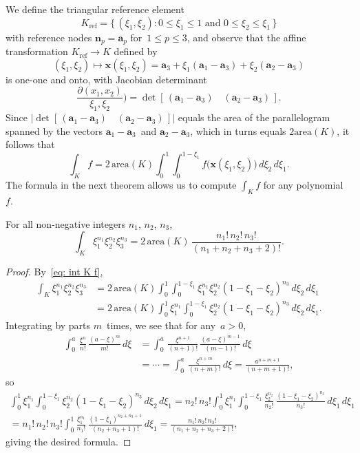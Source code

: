 We define the triangular reference element
\[
K_{\mathrm{ref}}=\{\,(\xi_1,\xi_2):
    \text{$0\le\xi_1\le1$ and $0\le\xi_2\le\xi_1$}\,\}
\]
with reference nodes $\boldsymbol{n}_p=\boldsymbol{a}_p$ for~$1\le p\le 3$,
and observe that the affine transformation $K_{\mathrm{ref}}\to K$ defined by
\[
(\xi_1,\xi_2)\mapsto\boldsymbol{x}(\xi_1,\xi_2)=\boldsymbol{a}_3
    +\xi_1(\boldsymbol{a}_1-\boldsymbol{a}_3)
    +\xi_2(\boldsymbol{a}_2-\boldsymbol{a}_3)
\]
is one-one and onto, with Jacobian determinant
\[
\frac{\partial(x_1,x_2)}{\xi_1,\xi_2})
    =\det[\,(\boldsymbol{a}_1-\boldsymbol{a}_3)\quad
            (\boldsymbol{a}_2-\boldsymbol{a}_3)\,].
\]
Since $\bigl|\det[\,(\boldsymbol{a}_1-\boldsymbol{a}_3)\quad
(\boldsymbol{a}_2-\boldsymbol{a}_3)\,]\bigr|$ equals the area of the 
parallelogram spanned by the vectors $\boldsymbol{a}_1-\boldsymbol{a}_3$~and 
$\boldsymbol{a}_2-\boldsymbol{a}_3$, which in turns equals $2\mathrm{area}(K)$, 
it follows that
\begin{equation}\label{eq: int K f}
\int_Kf=2\,\mathrm{area}(K)\int_0^1\int_0^{1-\xi_1}
    f\bigl(\boldsymbol{x}(\xi_1,\xi_2)\bigr)\,d\xi_2\,d\xi_1.
\end{equation}
The formula in the next theorem allows us to compute $\int_Kf$ for any 
polynomial~$f$.

\begin{theorem}\label{thm: int xi}
For all non-negative integers $n_1$, $n_2$, $n_3$,
\[
\int_K\xi_1^{n_1}\xi_2^{n_2}\xi_3^{n_3}=2\,\mathrm{area}(K)\,
    \frac{n_1!\,n_2!\,n_3!}{(n_1+n_2+n_3+2)!}.
\]
\end{theorem}
\begin{proof}
By~\eqref{eq: int K f},
\begin{align*}
\int_K\xi_1^{n_1}\xi_2^{n_2}\xi_3^{n_3}&=2\,\mathrm{area}(K)
    \int_0^1\int_0^{1-\xi_1}\xi_1^{n_1}\xi_2^{n_2}(1-\xi_1-\xi_2)^{n_3}
        \,d\xi_2\,d\xi_1\\
    &=2\,\mathrm{area}(K)
    \int_0^1\xi_1^{n_1}\int_0^{1-\xi_1}\xi_2^{n_2}(1-\xi_1-\xi_2)^{n_3}
        \,d\xi_2\,d\xi_1.
\end{align*}
Integrating by parts $m$~times, we see that for any~$a>0$,
\begin{align*}
\int_0^a\,\frac{\xi^n}{n!}\,\frac{(a-\xi)^m}{m!}\,d\xi
&=\int_0^a\,\frac{\xi^{n+1}}{(n+1)!}\,\frac{(a-\xi)^{m-1}}{(m-1)!}\,d\xi\\
&=\cdots
=\int_0^a\,\frac{\xi^{n+m}}{(n+m)!}\,d\xi=\frac{a^{n+m+1}}{(n+m+1)!},
\end{align*}
so
\begin{multline*}
\int_0^1\xi_1^{n_1}\int_0^{1-\xi_1}\xi_2^{n_2}(1-\xi_1-\xi_2)^{n_3}
        \,d\xi_2\,d\xi_1
    =n_2!\,n_3!\int_0^1\xi_1^{n_1}\int_0^{1-\xi_1}
    \frac{\xi_2^{n_2}}{n_2!}\,\frac{(1-\xi_1-\xi_2)^{n_3}}{n_3!}
        \,d\xi_1\,d\xi_1\\
    =n_1!\,n_2!\,n_3!\int_0^1\frac{\xi_1^{n_1}}{n_1!}\,
        \frac{(1-\xi_1)^{n_2+n_3+1}}{(n_2+n_3+1)!}\,d\xi_1
    =\frac{n_1!\,n_2!\,n_3!}{(n_1+n_2+n_3+2)!},
\end{multline*}
giving the desired formula.
\end{proof}


